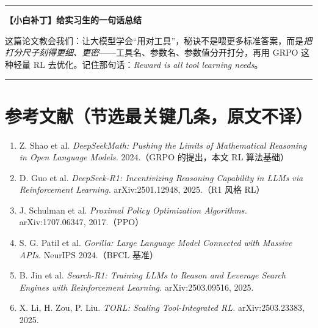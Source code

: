 \documentclass[11pt,UTF8,fontset=fandol]{ctexart}
\newenvironment{tip}[1]{%
  \par\smallskip\noindent\rule{\linewidth}{0.4pt}\par\nobreak
  \noindent\textbf{【小白补丁】#1}\par\nobreak\noindent\ignorespaces
}{%
  \par\noindent\rule{\linewidth}{0.4pt}\par\smallskip
}
\begin{document}
\begin{tip}{给实习生的一句话总结}
这篇论文教会我们：让大模型学会“用对工具”，秘诀不是喂更多标准答案，而是\emph{把打分尺子刻得更细、更密}——工具名、参数名、参数值分开打分，再用 GRPO 这种轻量 RL 去优化。记住那句话：\emph{Reward is all tool learning needs}。
\end{tip}

\section*{参考文献（节选最关键几条，原文不译）}
\begin{enumerate}[leftmargin=2em]
\item Z. Shao et al. \textit{DeepSeekMath: Pushing the Limits of Mathematical Reasoning in Open Language Models.} 2024.（GRPO 的提出，本文 RL 算法基础）
\item D. Guo et al. \textit{DeepSeek-R1: Incentivizing Reasoning Capability in LLMs via Reinforcement Learning.} arXiv:2501.12948, 2025.（R1 风格 RL）
\item J. Schulman et al. \textit{Proximal Policy Optimization Algorithms.} arXiv:1707.06347, 2017.（PPO）
\item S. G. Patil et al. \textit{Gorilla: Large Language Model Connected with Massive APIs.} NeurIPS 2024.（BFCL 基准）
\item B. Jin et al. \textit{Search-R1: Training LLMs to Reason and Leverage Search Engines with Reinforcement Learning.} arXiv:2503.09516, 2025.
\item X. Li, H. Zou, P. Liu. \textit{TORL: Scaling Tool-Integrated RL.} arXiv:2503.23383, 2025.
\end{enumerate}
\end{document}
